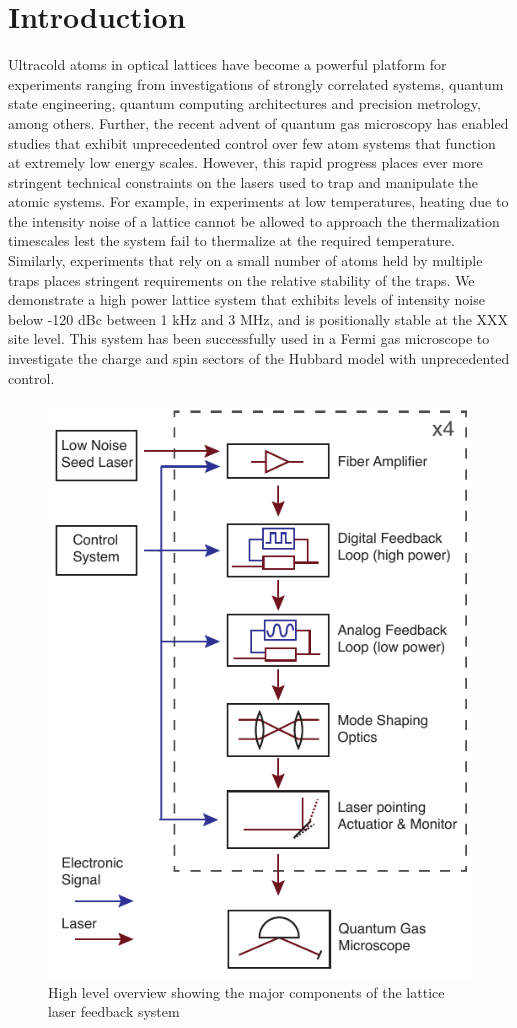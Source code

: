 \documentclass[twocolumn,aps,pra,showpacs,preprintnumbers,bibnotes]{revtex4-1}
\begin{document}
\section{Introduction}
Ultracold atoms in optical lattices have become a powerful platform for experiments ranging from investigations of strongly correlated systems, quantum state engineering, quantum computing architectures and precision metrology, among others.
Further, the recent advent of quantum gas microscopy has enabled studies that exhibit unprecedented control over few atom systems that function at extremely low energy scales.
However, this rapid progress places ever more stringent technical constraints on the lasers used to trap and manipulate the atomic systems.
For example, in experiments at low temperatures, heating due to the intensity noise of a lattice cannot be allowed to approach the thermalization timescales lest the system fail to thermalize at the required temperature.
Similarly, experiments that rely on a small number of atoms held by multiple traps places stringent requirements on the relative stability of the traps.
We demonstrate a high power lattice system that exhibits levels of intensity noise below -120 dBc between 1 kHz and 3 MHz, and is positionally stable at the XXX site level. 
This system has been successfully used in a Fermi gas microscope to investigate the charge and spin sectors of the Hubbard model with unprecedented control. 
\begin{figure}
    \includegraphics{figures/figure1/figure1.pdf}
    \caption{High level overview showing the major components of the lattice laser feedback system}
\end{figure}
\end{document}
